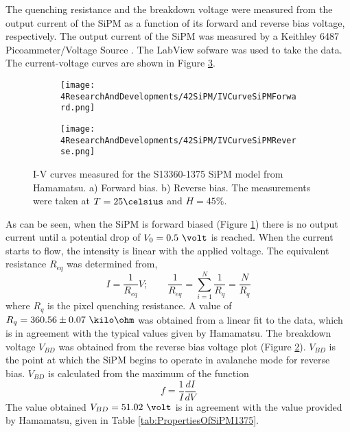The quenching resistance and the breakdown voltage were measured from the output current of the SiPM as a function of its forward and reverse bias voltage, respectively. The output current of the SiPM was measured by a Keithley 6487 Picoammeter/Voltage Source \cite{DataSheetKeithley6487}. The LabView sofware was used to take the data. The current-voltage curves are shown in Figure \ref{fig:IVcurveSiPM}.
\begin{figure}
\centering
    \begin{subfigure}[b]{0.9\textwidth}
    \centering
    \texttt{[image: 4ResearchAndDevelopments/42SiPM/IVCurveSiPMForward.png]}  
    \caption{\label{subfig:IVcurveForward}}
    \end{subfigure}
    \hfill
    \begin{subfigure}[b]{0.9\textwidth}
    \centering
    \texttt{[image: 4ResearchAndDevelopments/42SiPM/IVCurveSiPMReverse.png]}  
    \caption{\label{subfig:IVcurveReverse}}
    \end{subfigure}
 \caption{I-V curves measured for the S13360-1375 SiPM model from Hamamatsu. a) Forward bias. b) Reverse bias. The measurements were taken at $T=25\celsius$ and $H=45\%$.}
 \label{fig:IVcurveSiPM}
\end{figure}
As can be seen, when the SiPM is forward biased (Figure \ref{subfig:IVcurveForward}) there is no output current until a potential drop of $V_0= 0.5~\volt$ is reached. When the current starts to flow, the intensity is linear with the applied voltage. The equivalent resistance $R_{eq}$ was determined from, 
\begin{equation}
I=\frac{1}{R_{eq}}V;  \qquad \frac{1}{R_{eq}} = \sum_{i=1}^{N}\frac{1}{R_{q}}= \frac{N}{R_{q}}
\label{QuenchingResistance}
\end{equation}
where $R_{q}$ is the pixel quenching resistance. A value of $R_{q}= 360.56 \pm 0.07~\kilo\ohm$ was obtained from a linear fit to the data, which is in agreement with the typical values given by Hamamatsu. The breakdown voltage $V_{BD}$ was obtained from the reverse bias voltage plot (Figure \ref{subfig:IVcurveReverse}). $V_{BD}$ is the point at which the SiPM begins to operate in avalanche mode for reverse bias. $V_{BD}$ is calculated from the maximum of the function 
\begin{equation}
f=\frac{1}{I}\frac{dI}{dV}
\label{BreakDownVoltageFunction}
\end{equation}
The value obtained $V_{BD}=51.02~\volt$ is in agreement with the value provided by Hamamatsu, given in Table \ref{tab:PropertiesOfSiPM1375}.

